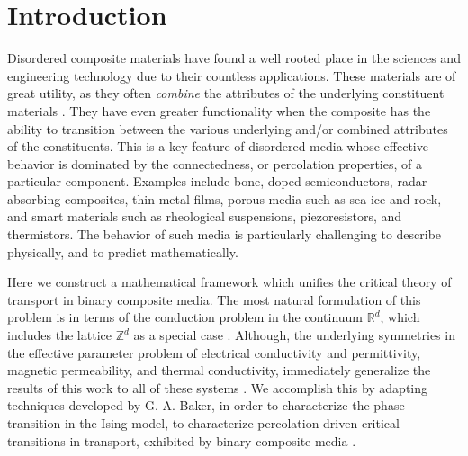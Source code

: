 \documentclass[jmp,graphicx]{revtex4-1}
\begin{document}

\maketitle %

%
\section{Introduction}\label{sec:Introduction}
%
Disordered composite materials have found a well rooted place in the
sciences and engineering technology due to their countless
applications. These materials are of great utility, as they often
\emph{combine} the attributes of the underlying constituent materials
\cite{MILTON:2002:TC}. They have even greater functionality when the
composite has the ability to transition between the various underlying
and/or combined attributes of the constituents. This is a key feature
of disordered media whose effective behavior is dominated by the
connectedness, or percolation properties, of a particular
component. Examples include bone, doped semiconductors, radar
absorbing composites, thin metal films, porous media such as sea ice
and rock, and smart materials such as rheological suspensions,
piezoresistors, and thermistors. The behavior of such media is
particularly  challenging to describe physically, and to predict
mathematically. 

Here we construct a mathematical framework which unifies the critical
theory of transport in binary composite media. The most natural
formulation of this problem is in terms of the conduction problem in
the continuum $\mathbb{R}^d$, which includes the lattice
$\mathbb{Z}^d$ as a special case
\cite{Golden:JMP-5627,Golden:CMP-473}. Although, the underlying
symmetries in the effective parameter problem of electrical
conductivity and permittivity, magnetic permeability, and thermal
conductivity, immediately generalize the results of this work to
all of these systems \cite{MILTON:2002:TC}. We accomplish this by
adapting techniques developed by G. A. Baker, in order to characterize
the phase transition in the Ising model, to characterize percolation
driven critical transitions in transport, exhibited by binary
composite media \cite{Baker-1990}.  
\end{document}
